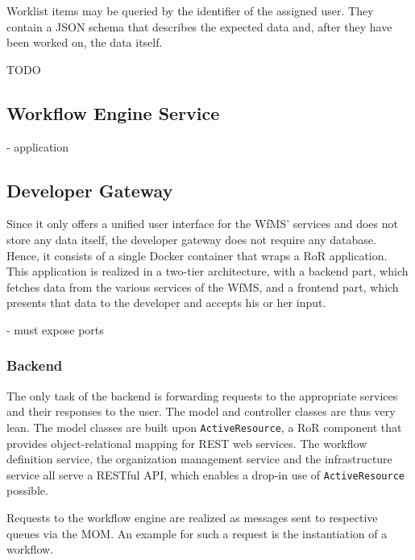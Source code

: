       Worklist items may be queried by the identifier of the assigned user. They contain a JSON schema that describes the expected data and, after they have been worked on, the data itself.

      TODO

  \subsection{Workflow Engine Service} %
    \label{sub:workflow_engine_service}
      - application

  \subsection{Developer Gateway} %
    \label{sub:developer_gateway}

      Since it only offers a unified user interface for the \ac{WfMS}' services and does not store any data itself, the developer gateway does not require any database. Hence, it consists of a single Docker container that wraps a \ac{RoR} application. This application is realized in a two-tier architecture, with a backend part, which fetches data from the various services of the \ac{WfMS}, and a frontend part, which presents that data to the developer and accepts his or her input.

      - must expose ports

      \subsubsection{Backend} %
      \label{ssub:backend}
        The only task of the backend is forwarding requests to the appropriate services and their responses to the user. The model and controller classes are thus very lean. The model classes are built upon \texttt{ActiveResource}, a \ac{RoR} component that provides object-relational mapping for REST web services. The workflow definition service, the organization management service and the infrastructure service all serve a RESTful API, which enables a drop-in use of \texttt{ActiveResource} possible.

        Requests to the workflow engine are realized as messages sent to respective queues via the \ac{MOM}. An example for such a request is the instantiation of a workflow.

